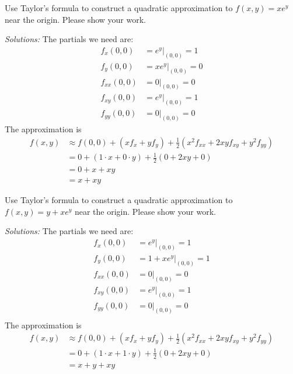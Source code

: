 \ifnum {}
\question[4] Use Taylor's formula to construct a quadratic approximation to $f(x,y) = xe^y$ near the origin. Please show your work. 
\ifnum {} {\color{DarkBlue}  \textit{Solutions:} The partials we need are: 
\begin{align*}
    f_x(0,0) &= e^y\big|_{(0,0)} = 1 \\
    f_y(0,0) &= xe^y \big|_{(0,0)} = 0 \\
    f_{xx}(0,0) &= 0\big|_{(0,0)} = 0 \\
    f_{xy}(0,0) &= e^y \big|_{(0,0)} = 1 \\    
    f_{yy}(0,0) &= 0 \big|_{(0,0)} = 0 
\end{align*}
The approximation is
\begin{align*}
    f(x,y) &\approx f(0,0) + (xf_x + yf_y) + \frac12(x^2f_{xx} + 2xyf_{xy} + y^2f_{yy}) \\ &= 0 + (1\cdot x+0\cdot y) + \frac12 (0+2xy+0) \\ &= 0 + x+xy \\&=x+xy 
\end{align*}

    } 
   \else
      
   \fi
    
\fi



\ifnum {}
\question[4] Use Taylor's formula to construct a quadratic approximation to $f(x,y) = y+ xe^y$ near the origin. Please show your work. 
\ifnum {} {\color{DarkBlue}  \textit{Solutions:} The partials we need are: 
\begin{align*}
    f_x(0,0) &= e^y\big|_{(0,0)} = 1 \\
    f_y(0,0) &= 1 + xe^y \big|_{(0,0)} = 1 \\
    f_{xx}(0,0) &= 0\big|_{(0,0)} = 0 \\
    f_{xy}(0,0) &= e^y \big|_{(0,0)} = 1 \\    
    f_{yy}(0,0) &= 0 \big|_{(0,0)} = 0 \\    
\end{align*}
The approximation is
\begin{align*}
    f(x,y) &\approx f(0,0) + (xf_x + yf_y) + \frac12(x^2f_{xx} + 2xyf_{xy} + y^2f_{yy}) \\ &= 0 + (1\cdot x+1\cdot y) + \frac12 (0+2xy+0) \\ &= x+ y+xy
\end{align*}

    } 
   \else
      
   \fi
    
\fi